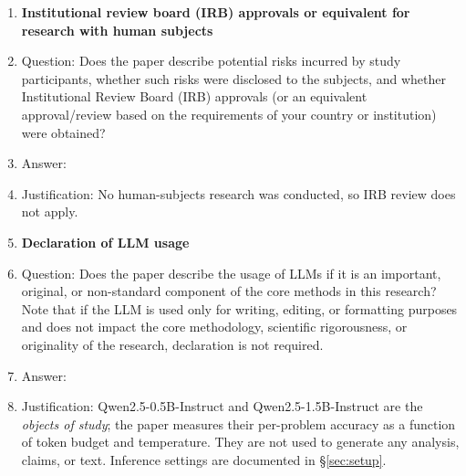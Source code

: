 \documentclass{article}
\begin{document}
\begin{enumerate}
\item {\bf Institutional review board (IRB) approvals or equivalent for research with human subjects}
    \item[] Question: Does the paper describe potential risks incurred by study participants, whether such risks were disclosed to the subjects, and whether Institutional Review Board (IRB) approvals (or an equivalent approval/review based on the requirements of your country or institution) were obtained?
    \item[] Answer: \answerNA{}
    \item[] Justification: No human-subjects research was conducted, so IRB review does not apply.

\item {\bf Declaration of LLM usage}
    \item[] Question: Does the paper describe the usage of LLMs if it is an important, original, or non-standard component of the core methods in this research? Note that if the LLM is used only for writing, editing, or formatting purposes and does not impact the core methodology, scientific rigorousness, or originality of the research, declaration is not required.
    \item[] Answer: \answerYes{}
    \item[] Justification: Qwen2.5-0.5B-Instruct and Qwen2.5-1.5B-Instruct are the \emph{objects of study}; the paper measures their per-problem accuracy as a function of token budget and temperature. They are not used to generate any analysis, claims, or text. Inference settings are documented in \S\ref{sec:setup}.

\end{enumerate}
\end{document}
